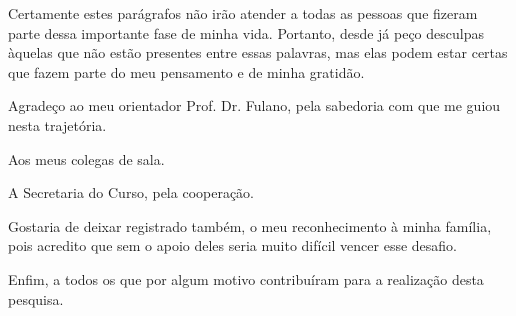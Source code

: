 
\begin{agradecimentos}

Certamente estes parágrafos não irão atender a todas as pessoas que fizeram parte dessa importante fase de minha vida. Portanto, desde já peço desculpas àquelas que não estão presentes entre essas palavras, mas elas podem estar certas que fazem parte do meu pensamento e de minha gratidão. 

Agradeço ao meu orientador Prof. Dr. Fulano, pela sabedoria com que me guiou nesta trajetória.

Aos meus colegas de sala.

A Secretaria do Curso, pela cooperação.

Gostaria de deixar registrado também, o meu reconhecimento à minha família, pois acredito que sem o apoio deles seria muito difícil vencer esse desafio. 

Enfim, a todos os que por algum motivo contribuíram para a realização desta pesquisa.

\end{agradecimentos} 